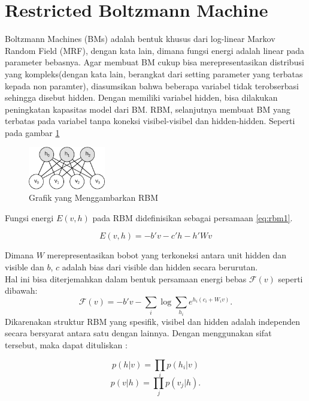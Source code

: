 \section{Restricted Boltzmann Machine}
Boltzmann Machines (BMs) adalah bentuk khusus dari log-linear Markov Random Field (MRF), dengan kata lain, dimana fungsi energi adalah linear pada parameter bebasnya. Agar membuat BM cukup bisa merepresentasikan distribusi yang kompleks(dengan kata lain, berangkat dari setting parameter yang terbatas kepada non paramter), diasumsikan bahwa beberapa variabel tidak terobserbasi sehingga disebut hidden. Dengan memiliki variabel hidden, bisa dilakukan peningkatan kapasitas model dari BM. RBM, selanjutnya membuat BM yang terbatas pada variabel tanpa koneksi visibel-visibel dan hidden-hidden. Seperti pada gambar \ref{fig:rbm} \citep{hinton2006reducing}\\
\begin{figure}
	\centering
	\includegraphics[width=0.3\textwidth]
		{pics/rbm.png}
	\caption{Grafik yang Menggambarkan RBM}
	\label{fig:rbm}
\end{figure}

Fungsi energi $E(v,h)$ pada RBM didefinisikan sebagai persamaan \ref{eq:rbm1}.

\begin{equation}
E(v,h) = - b'v - c'h - h'Wv
\label{eq:rbm1}
\end{equation}

Dimana $W$ merepresentasikan bobot yang terkoneksi antara unit hidden dan visible dan $b$, $c$ adalah bias dari visible dan hidden secara berurutan.\\

Hal ini bisa diterjemahkan dalam bentuk persamaan energi bebas $\mathcal{F}(v)$ seperti dibawah:
\[\mathcal{F}(v)= - b'v - \sum_i \log \sum_{h_i} e^{h_i (c_i + W_i v)}.\]
Dikarenakan struktur RBM yang spesifik, visibel dan hidden adalah independen secara bersyarat antara satu dengan lainnya. Dengan menggunakan sifat tersebut, maka dapat dituliskan :

\[p(h|v) = \prod_i p(h_i|v)\]
\[p(v|h) = \prod_j p(v_j|h).\]

